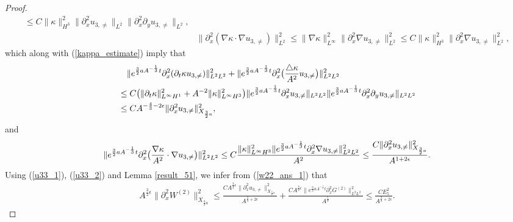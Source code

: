 \documentclass[12pt, reqno]{amsart}
\numberwithin{equation}{section}
\begin{document}
\begin{proof}
\begin{equation*}
\begin{aligned}
				\leq  C\|\kappa\|^2_{H^3}
				\|\partial_x^2u_{3,\neq}\|_{L^2}
				\|\partial_x^2\partial_yu_{3,\neq}\|_{L^2},\\
				&\|\partial_x^2(\nabla\kappa\cdot\nabla
				u_{3,\neq})\|^2_{L^2}
				\leq \|\nabla \kappa\|^2_{L^{\infty}}
				\|\partial_x^2\nabla u_{3,\neq}\|^2_{L^2}
				\leq  C\|\kappa\|^2_{H^3}
				\|\partial_x^2\nabla u_{3,\neq}\|^2_{L^2},
			\end{aligned}
		\end{equation*}
		which along with (\ref{kappa_estimate}) imply that 
		\begin{equation}\label{u33_1}
			\begin{aligned}
				&\quad \|{\rm e}^{\frac32aA^{-\frac{1}{3}}t}
				\partial_x^2(\partial_t\kappa u_{3,\neq})\|^2_{L^2L^2}
				+\|{\rm e}^{\frac32aA^{-\frac{1}{3}}t}\partial_x^2
				\big(\frac{{\triangle\kappa}}{A^2}u_{3,\neq}\big)\|^2_{L^2L^2}
				\\
				&\leq C\big(\|\partial_t\kappa\|^2_{L^{\infty}H^1}+
				A^{-2}\|\kappa\|^2_{L^{\infty}H^3}\big)
				\|{\rm e}^{\frac32aA^{-\frac{1}{3}}t}
				\partial_x^2 u_{3,\neq}\|_{L^2L^2}
				\|{\rm e}^{\frac32aA^{-\frac{1}{3}}t}
				\partial_x^2\partial_y u_{3,\neq}\|_{L^2L^2}\\
				&\leq CA^{-\frac43-2\epsilon}\|\partial_x^2u_{3,\neq}\|_{X_{\frac32a}}^2,
			\end{aligned}
		\end{equation}
		and 
		\begin{equation}\label{u33_2}
			\begin{aligned}
				&\quad\|{\rm e}^{\frac32aA^{-\frac{1}{3}}t}\partial_x^2
				\big(\frac{\nabla\kappa}{A^2}\cdot\nabla u_{3,\neq}\big)\|^2_{L^2L^2}
				\leq C\frac{\|\kappa\|^2_{L^{\infty}H^3}\|{\rm e}^{\frac32aA^{-\frac{1}{3}}t}
					\partial_x^2\nabla u_{3,\neq}\|_{L^2L^2}^2}{A^2}
				\leq\frac{C\|\partial_x^2u_{3,\neq}\|_{X_{\frac32a}}^2}
				{A^{1+2\epsilon}}.
			\end{aligned}
		\end{equation}
		Using (\ref{u33_1}), (\ref{u33_2}) and Lemma \ref{result_51}, we infer from  (\ref{w22_ans_1}) that
		\begin{equation}\label{w22_ans_2}
			\begin{aligned}
				A^{\frac32\epsilon}\|\partial_x^2W^{(2)}\|^2_{X_{\frac32a}}\leq \frac{CA^{\frac32\epsilon}\|\partial_x^2u_{3,\neq}\|_{X_{\frac32a}}^2}{A^{\frac23+2\epsilon}}+\frac{CA^{\frac32\epsilon}\|e^{\frac32aA^{-\frac13}t}\partial_{x}^{2}G^{(2)}\|_{L^{2}L^{2}}^{2}}{A^{\frac53}}
				\leq  \frac{CE_5^2}{A^{\frac23+2\epsilon}}.

\end{aligned}
\end{equation}
\end{proof}
\end{document}
